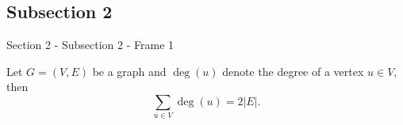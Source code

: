 \documentclass[handout,compress,xcolor={dvipsnames,table},aspectratio=1610]{beamer}
\begin{document}
  \subsection{Subsection 2}
  \begin{frame}{Section 2 - Subsection 2 - Frame 1}
    \begin{theorem}
      Let $G = (V,E)$ be a graph and $\deg(u)$ denote the degree of a vertex $u \in V$, then $$\sum_{u \in V} \deg(u) = 2 \vert E \vert.$$
    \end{theorem}
  \end{frame}

\end{document}
